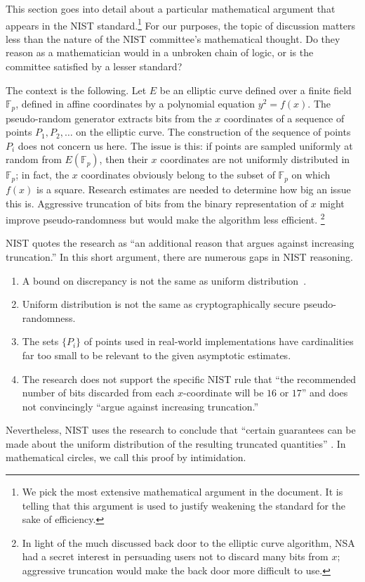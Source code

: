\documentclass[11pt]{amsart} %
\newcommand{\ring}[1]{\mathbb{#1}}
\begin{document}
This section goes into detail about a particular mathematical argument that appears in the
NIST standard.\footnote{We pick the most extensive mathematical argument in the document.  It is telling
that this argument is used to justify weakening the standard for the sake of efficiency.} 
For our purposes, the topic of discussion matters less than the nature of the NIST committee's mathematical
thought.  Do they reason as a mathematician would in a unbroken chain of logic, or is the committee
satisfied by a lesser standard? 


The context is the following.  Let $E$ be an elliptic curve defined over a finite field $\ring{F}_p$,
defined in affine coordinates by a polynomial equation
$y^2 = f(x)$.
The pseudo-random generator extracts bits from the
 $x$ coordinates of a sequence of points $P_1, P_2,\ldots $ 
on the elliptic curve.  The construction of the sequence of points $P_i$ does not concern us here.
The issue is this: if points are sampled uniformly at random from $E(\ring{F}_p)$, then their $x$ coordinates are 
not uniformly distributed in $\ring{F}_p$; in fact, the $x$ coordinates obviously belong to the subset of $\ring{F}_p$ on which $f(x)$ is a square.  
Research estimates are needed to
determine how big an issue this is.   Aggressive truncation of bits from the binary representation of $x$ might improve pseudo-randomness
but would make the algorithm less efficient.%
\footnote{In light of the much discussed back door to the elliptic curve algorithm, NSA had a secret interest
in persuading users not to discard many bits from  $x$; aggressive truncation would
make the back door more difficult to use.}

NIST quotes the research \cite{MS2000} as ``an additional reason that argues against increasing truncation.''
In this short argument, there are numerous gaps in NIST reasoning.
\begin{enumerate}
\item A bound on discrepancy is not the same as uniform distribution~\cite{SDA1651}.
\item Uniform distribution is not the same as cryptographically secure pseudo-randomness.
\item The sets $\{P_i\}$ of points  used in real-world implementations have cardinalities far too small to
be relevant to the given asymptotic estimates.
\item The research does not support the specific NIST rule that ``the recommended number of bits discarded
from each $x$-coordinate will be $16$ or $17$'' and does not convincingly ``argue against increasing truncation.''
\end{enumerate}
Nevertheless, NIST uses the research to conclude that ``certain
guarantees can be made about the uniform distribution of the resulting truncated quantities'' \cite{NIST}.
In mathematical circles, we call this proof by intimidation.
\end{document}
